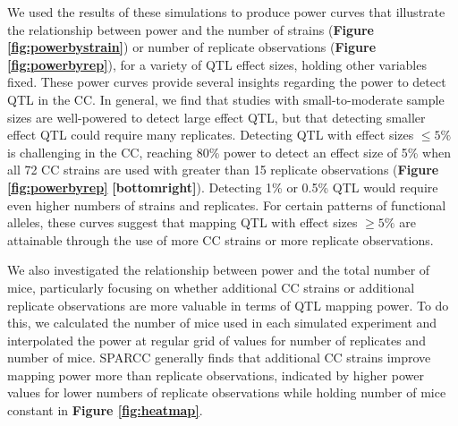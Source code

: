 We used the results of these simulations to produce power curves that illustrate the relationship between power and the number of strains (\textbf{Figure \ref{fig:powerbystrain}}) or number of replicate observations (\textbf{Figure \ref{fig:powerbyrep}}), for a variety of QTL effect sizes, holding other variables fixed. These power curves provide several insights regarding the power to detect QTL in the CC. In general, we find that studies with small-to-moderate sample sizes are well-powered to detect large effect QTL, but that detecting smaller effect QTL could require many replicates. Detecting QTL with effect sizes $\leq 5\%$ is challenging in the CC, reaching 80\% power to detect an effect size of 5\% when all 72 CC strains are used with greater than 15 replicate observations (\textbf{Figure \ref{fig:powerbyrep}} \textbf{[bottomright]}). Detecting 1\% or 0.5\% QTL would require even higher numbers of strains and replicates. For certain patterns of functional alleles, these curves suggest that mapping QTL with effect sizes $\geq 5\%$ are attainable through the use of more CC strains or more replicate observations.

We also investigated the relationship between power and the total number of mice, particularly focusing on whether additional CC strains or additional replicate observations are more valuable in terms of QTL mapping power. To do this, we calculated the number of mice used in each simulated experiment and interpolated the power at regular grid of values for number of replicates and number of mice. SPARCC generally finds that additional CC strains improve mapping power more than replicate observations, indicated by higher power values for lower numbers of replicate observations while holding number of mice constant in \textbf{Figure \ref{fig:heatmap}}. 

